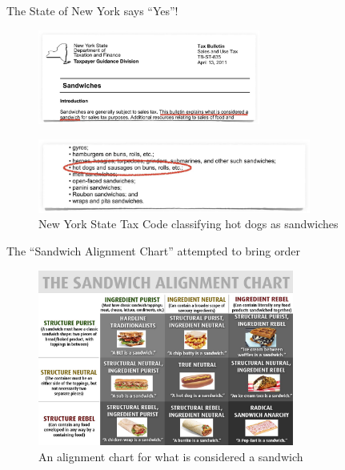 \documentclass{beamer}
\begin{document}
\begin{frame}{The State of New York says ``Yes''!}
    \begin{figure}
        \includegraphics[width=0.65\textwidth]{images/cube_rule_of_food/ny_sandwich_law_1.jpg}
        \label{fig:ny-sandwich-law-top}
    \end{figure}
    \begin{figure}
        \includegraphics[width=0.8\textwidth]{images/cube_rule_of_food/ny_sandwich_law_2.jpg}
        \caption{\label{fig:ny-sandwich-law-bottom}New York State Tax Code classifying hot dogs as sandwiches}
    \end{figure}
\end{frame}

\begin{frame}{The ``Sandwich Alignment Chart'' attempted to bring order}
    \begin{figure}
        \includegraphics[width=0.75\textwidth]{images/cube_rule_of_food/sandwich_alignment.jpg}
        \caption{\label{fig:sandwich-alignment}An alignment chart for what is considered a sandwich \cite{noauthor_matttomic_nodate}}
    \end{figure}
\end{frame}
\end{document}
